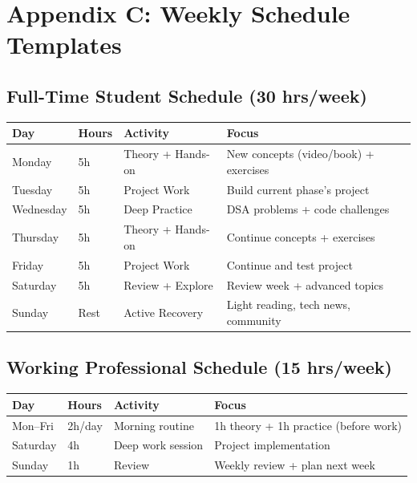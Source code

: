\documentclass[11pt, a4paper, oneside]{report}
\begin{document}
{{{{{%
\clearpage
\chapter[Schedule Templates]{Appendix C: Weekly Schedule Templates}

\section[Full-Time Schedule]{Full-Time Student Schedule (30 hrs/week)}

{\small
{}
\begin{longtable}{L{0.12\textwidth} L{0.10\textwidth} L{0.35\textwidth} L{0.33\textwidth}}
\toprule
\textbf{Day} & \textbf{Hours} & \textbf{Activity} & \textbf{Focus} \\
\midrule
\endfirsthead
\bottomrule
\endlastfoot
Monday & 5h & Theory + Hands-on & New concepts (video/book) + exercises \\
Tuesday & 5h & Project Work & Build current phase's project \\
Wednesday & 5h & Deep Practice & DSA problems + code challenges \\
Thursday & 5h & Theory + Hands-on & Continue concepts + exercises \\
Friday & 5h & Project Work & Continue and test project \\
Saturday & 5h & Review + Explore & Review week + advanced topics \\
Sunday & Rest & Active Recovery & Light reading, tech news, community \\
\end{longtable}

\section[Professional Schedule]{Working Professional Schedule (15 hrs/week)}

{\small
{}
\begin{longtable}{L{0.12\textwidth} L{0.10\textwidth} L{0.35\textwidth} L{0.33\textwidth}}
\toprule
\textbf{Day} & \textbf{Hours} & \textbf{Activity} & \textbf{Focus} \\
\midrule
\endfirsthead
\bottomrule
\endlastfoot
Mon--Fri & 2h/day & Morning routine & 1h theory + 1h practice (before work) \\
Saturday & 4h & Deep work session & Project implementation \\
Sunday & 1h & Review & Weekly review + plan next week \\
\end{longtable}

}}}}}}}
\end{document}

